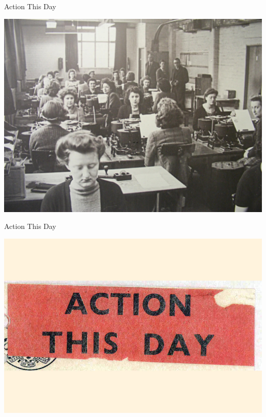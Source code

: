 \documentclass[hyphens,aspectratio=169]{beamer}
\begin{document}


\begin{frame}[fragile]{Action This Day}
	\begin{center}
		\includegraphics[scale=0.23]{paper/images/codebreakers.jpg}
	\end{center}
\end{frame}

\begin{frame}[fragile]{Action This Day}
	\begin{center}
		\includegraphics[scale=0.3]{paper/images/action_this_day.jpg}
	\end{center}
\end{frame}
\end{document}

